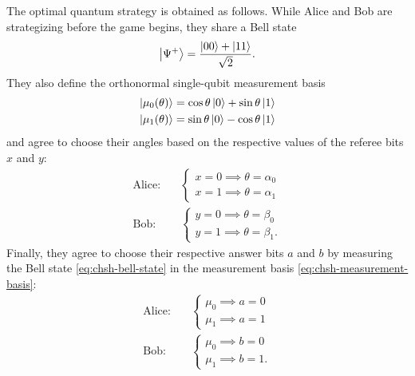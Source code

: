 \documentclass[12pt]{article}
\begin{document}
\begin{appendices}
The optimal quantum strategy is obtained as follows. While Alice and Bob are strategizing before the game begins, they share a Bell state
\begin{equation}
\ket{\Psi^+} = \frac{\ket{00} + \ket{11}}{\sqrt{2}}.
\label{eq:chsh-bell-state}
\end{equation}
They also define the orthonormal single-qubit measurement basis
\begin{equation}
\begin{aligned}
    \ket{\mu_0(\theta)} &= \cos\theta\ket{0} + \sin\theta\ket{1} \\
    \ket{\mu_1(\theta)} &= \sin\theta\ket{0} - \cos\theta\ket{1}
\end{aligned}
\label{eq:chsh-measurement-basis}
\end{equation}
and agree to choose their angles based on the respective values of the referee bits $x$ and $y$:
\begin{equation}
\begin{aligned}
\text{Alice:} &\quad \begin{cases}
    x = 0 \implies \theta = \alpha_0\\
    x = 1 \implies \theta = \alpha_1
\end{cases}\\
\text{Bob:} &\quad \begin{cases}
    y = 0 \implies \theta = \beta_0\\
    y = 1 \implies \theta = \beta_1.
\end{cases}
\end{aligned}
\label{eq:chsh-angle}
\end{equation}
Finally, they agree to choose their respective answer bits $a$ and $b$ by measuring the Bell state \eqref{eq:chsh-bell-state} in the measurement basis \eqref{eq:chsh-measurement-basis}:
\begin{equation}
\begin{aligned}
\text{Alice:} &\quad \begin{cases}
    \mu_0 \implies a = 0 \\
    \mu_1 \implies a = 1
\end{cases}\\
\text{Bob:} &\quad \begin{cases}
    \mu_0 \implies b = 0 \\
    \mu_1 \implies b = 1.
\end{cases}
\end{aligned}
\label{eq:chsh-answer}
\end{equation}


\end{appendices}
\end{document}
